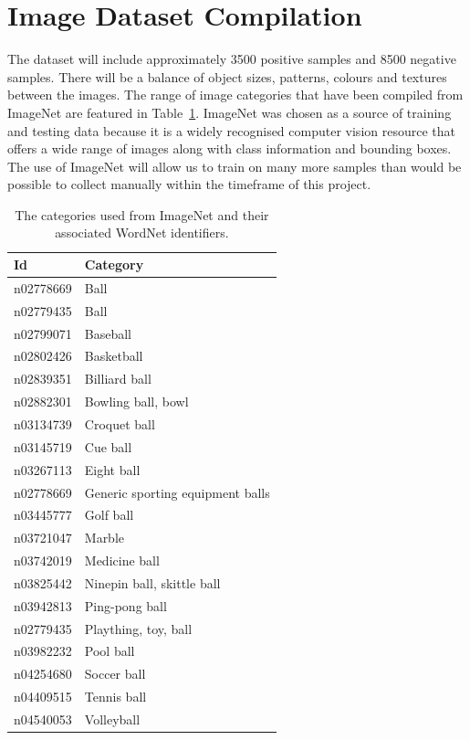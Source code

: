 \documentclass{llncs}
\begin{document}
	\section{Image Dataset Compilation} {
	\label{sec:dataset}

		The dataset will include approximately 3500 positive samples and 8500 negative samples. There will be a balance of object sizes, patterns, colours and textures between the images. The range of image categories that have been compiled from ImageNet are featured in Table~\ref{tab:imagenet}. ImageNet was chosen as a
		source of training and testing data because it is a widely recognised computer vision resource that offers a wide range of images along with class information and bounding boxes. The use of ImageNet will allow us to train on many more samples than would be possible to collect manually within the timeframe of this project.

		\begin{table}
			\centering
			\caption{The categories used from ImageNet and their associated WordNet \citep{fellbaum1998wordnet} identifiers.}
			\label{tab:imagenet}
			\begin{tabularx}{\textwidth}{lX}
				\toprule
				\textbf{Id} & \textbf{Category} \\
				\midrule
					n02778669 & Ball \\
					n02779435 & Ball \\
					n02799071 & Baseball \\
					n02802426 & Basketball \\
					n02839351 & Billiard ball \\
					n02882301 & Bowling ball, bowl \\
					n03134739 & Croquet ball \\
					n03145719 & Cue ball \\
					n03267113 & Eight ball \\
					n02778669 & Generic sporting equipment balls \\
					n03445777 & Golf ball \\
					n03721047 & Marble \\
					n03742019 & Medicine ball \\
					n03825442 & Ninepin ball, skittle ball \\
					n03942813 & Ping-pong ball \\
					n02779435 & Plaything, toy, ball \\
					n03982232 & Pool ball \\
					n04254680 & Soccer ball \\
					n04409515 & Tennis ball \\
					n04540053 & Volleyball \\
				\bottomrule
			\end{tabularx}
		\end{table}

}
\end{document}
